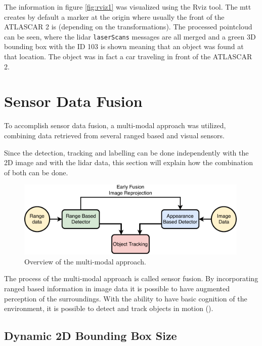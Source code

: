 The information in figure \ref{fig:rviz1} was visualized using the Rviz tool. The \gls{mtt} creates by default a marker at the origin where usually the front of the ATLASCAR 2 is (depending on the transformations). The processed pointcloud can be seen, where the \gls{lidar} \texttt{laserScans} messages are all merged and a green 3D bounding box with the ID 103 is shown meaning that an object was found at that location. The object was in fact a car traveling in front of the ATLASCAR 2. 

\section{Sensor Data Fusion}

To accomplish sensor data fusion, a multi-modal approach was utilized, combining data retrieved from several ranged based and visual sensors.

Since the detection, tracking and labelling can be done independently with the 2D image and with the \gls{lidar} data, this section will explain how the combination of both can be done.

\begin{figure}[htp]
	
	\centering
	\includegraphics[width=0.99\textwidth]{caplabel/imgs/multimodal}
	
	\caption{Overview of the multi-modal approach. }
	\label{fig:multimodal}
	
\end{figure}

The process of the multi-modal approach is called sensor fusion. By incorporating ranged based information in image data it is possible to have augmented perception of the surroundings. With the ability to have basic cognition of the environment, it is possible to detect and track objects in motion (\cite{Spinello2010}).

\subsection{Dynamic 2D Bounding Box Size}

